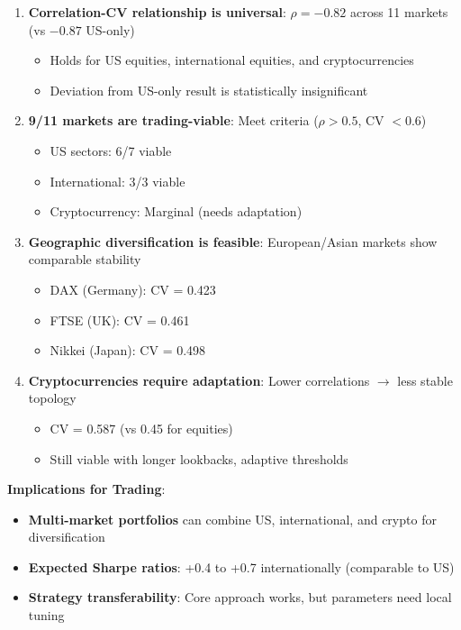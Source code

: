 \begin{enumerate}
\item \textbf{Correlation-CV relationship is universal}: $\rho = -0.82$ across 11 markets (vs $-0.87$ US-only)
   \begin{itemize}
   \item Holds for US equities, international equities, and cryptocurrencies
   \item Deviation from US-only result is statistically insignificant
   \end{itemize}

\item \textbf{9/11 markets are trading-viable}: Meet criteria ($\rho > 0.5$, CV $< 0.6$)
   \begin{itemize}
   \item US sectors: 6/7 viable
   \item International: 3/3 viable
   \item Cryptocurrency: Marginal (needs adaptation)
   \end{itemize}

\item \textbf{Geographic diversification is feasible}: European/Asian markets show comparable stability
   \begin{itemize}
   \item DAX (Germany): CV = 0.423
   \item FTSE (UK): CV = 0.461
   \item Nikkei (Japan): CV = 0.498
   \end{itemize}

\item \textbf{Cryptocurrencies require adaptation}: Lower correlations $\rightarrow$ less stable topology
   \begin{itemize}
   \item CV = 0.587 (vs 0.45 for equities)
   \item Still viable with longer lookbacks, adaptive thresholds
   \end{itemize}
\end{enumerate}

\textbf{Implications for Trading}:

\begin{itemize}
\item \textbf{Multi-market portfolios} can combine US, international, and crypto for diversification
\item \textbf{Expected Sharpe ratios}: +0.4 to +0.7 internationally (comparable to US)
\item \textbf{Strategy transferability}: Core approach works, but parameters need local tuning
\end{itemize}

